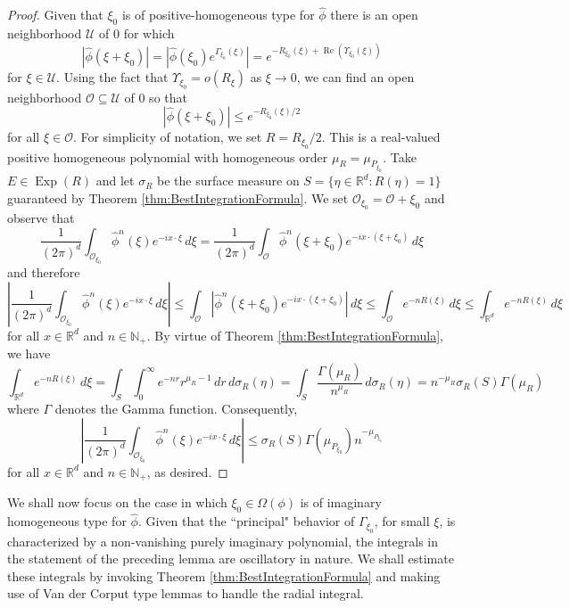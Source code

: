 \documentclass[11pt]{article}
\renewcommand\Re{\operatorname{Re}}%
\newcommand\Exp{\operatorname{Exp}}
\begin{document}
\begin{proof}
Given that $\xi_0$ is of positive-homogeneous type for $\widehat{\phi}$ there is an open neighborhood $\mathcal{U}$ of $0$ for which
\begin{equation*}
    \left|\widehat{\phi}(\xi+\xi_0)\right|=\left|\widehat{\phi}(\xi_0)e^{\Gamma_{\xi_0}(\xi)}\right|=e^{-R_{\xi_0}(\xi)+\Re(\Upsilon_{\xi_0}(\xi))}
\end{equation*}
for $\xi\in \mathcal{U}$. Using the fact that $\Upsilon_{\xi_0}=o(R_{\xi})$ as $\xi\to 0$, we can find an open neighborhood $\mathcal{O}\subseteq\mathcal{U}$ of $0$  so that
\begin{equation*}
    \left|\widehat{\phi}(\xi+\xi_0)\right|\leq e^{-R_{\xi_0}(\xi)/2}
\end{equation*}
for all $\xi\in\mathcal{O}$. For simplicity of notation, we set $R=R_{\xi_0}/2$. This is a real-valued positive homogeneous polynomial with homogeneous order $\mu_R=\mu_{P_{\xi_0}}$. Take $E\in\Exp(R)$ and let $\sigma_R$ be the surface measure on  $S=\{\eta\in\mathbb{R}^d:R(\eta)=1\}$ guaranteed by Theorem \ref{thm:BestIntegrationFormula}.  We set $\mathcal{O}_{\xi_0}=\mathcal{O}+\xi_0$ and observe that
\begin{equation*}
    \frac{1}{(2\pi)^d}\int_{\mathcal{O}_{\xi_0}}\widehat{\phi}^n(\xi)e^{-ix\cdot\xi}\,d\xi=\frac{1}{(2\pi)^d}\int_{\mathcal{O}}\widehat{\phi}^n(\xi+\xi_0)e^{-ix\cdot(\xi+\xi_0)}\,d\xi
\end{equation*}
and therefore
\begin{equation*}
    \left|\frac{1}{(2\pi)^d}\int_{\mathcal{O}_{\xi_0}}\widehat{\phi}^n(\xi)e^{-ix\cdot\xi}\,d\xi\right|\leq \int_{\mathcal{O}}\left|\widehat{\phi}^n(\xi+\xi_0)e^{-i x\cdot(\xi+\xi_0)}\right|\,d\xi\leq \int_{\mathcal{O}}e^{-nR(\xi)}\,d\xi\leq\int_{\mathbb{R}^d} e^{-nR(\xi)}\,d\xi
\end{equation*}
for all $x\in\mathbb{R}^d$ and $n\in\mathbb{N}_+$. By virtue of Theorem \ref{thm:BestIntegrationFormula}, we have
\begin{equation*}
\int_{\mathbb{R}^d}e^{-nR(\xi)}\,d\xi=\int_S \int_0^\infty e^{-nr}r^{\mu_R-1}\,dr\,d\sigma_R(\eta)=\int_S \frac{\Gamma(\mu_R)}{n^{\mu_R}}\,d\sigma_R(\eta)=n^{-\mu_R}\sigma_R(S)\Gamma(\mu_R)
\end{equation*}
where $\Gamma$ denotes the Gamma function. Consequently,
\begin{equation*}
    \left|\frac{1}{(2\pi)^d}\int_{\mathcal{O}_{\xi_0}}\widehat{\phi}^n(\xi)e^{-ix\cdot\xi}\,d\xi\right|\leq \sigma_R(S)\Gamma(\mu_{P_{\xi_0}})n^{-\mu_{P_{\xi_0}}}
\end{equation*}
for all $x\in\mathbb{R}^d$ and $n\in\mathbb{N}_+$, as desired.
\end{proof}
We shall now focus on the case in which $\xi_0\in\Omega(\phi)$ is of imaginary homogeneous type for $\widehat{\phi}$. Given that the ``principal" behavior of $\Gamma_{\xi_0}$, for small $\xi$, is characterized by a non-vanishing purely imaginary polynomial, the integrals in the statement of the preceding lemma are oscillatory in nature. We shall estimate these integrals by invoking Theorem \ref{thm:BestIntegrationFormula} and making use of Van der Corput type lemmas to handle the radial integral.  
\end{document}
